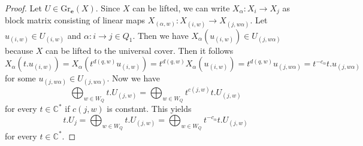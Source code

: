 \documentclass{amsart}
\newcommand{\bfe}{\mathbf{e}}
\newcommand{\C}{\mathbb{C}}
\newcommand{\Gr}{\mathrm{Gr}}
\begin{document}
\begin{proof} Let $U\in \Gr_\bfe(X)$. Since $X$ can be lifted, we can write $X_\alpha:X_i\to X_j$ as block matrix consisting of linear maps $X_{(\alpha,w)}:X_{(i,w)}\to X_{(j,w\alpha)}$. Let $u_{(i,w)}\in U_{(i,w)}$ and $\alpha:i\to j\in Q_1$. Then we have $X_\alpha(u_{(i,w)})\in U_{(j,w\alpha)}$ because $X$ can be lifted to the universal cover. Then it follows
\[X_\alpha(t.u_{(i,w)})=X_\alpha(t^{d(q,w)}u_{(i,w)})=t^{d(q,w)}X_\alpha(u_{(i,w)})=t^{d(q,w)}u_{(j,w\alpha)}=t^{-c_\alpha}t.u_{(j,w\alpha)}\]
for some $u_{(j,w\alpha)}\in U_{(j,w\alpha)}$.
Now we have \[\bigoplus_{w\in W_Q} t.U_{(j,w)}=\bigoplus_{w\in W_Q}t^{c(j,w)}t.U_{(j,w)}\]
for every $t\in\C^\ast$ if $c(j,w)$ is constant. This yields  
\[t.U_j=\bigoplus_{w\in W_Q} t.U_{(j,w)}=\bigoplus_{w\in W_Q}t^{-c_\alpha}t.U_{(j,w)}\]
for every $t\in \C^\ast$.
\end{proof}
\end{document}
